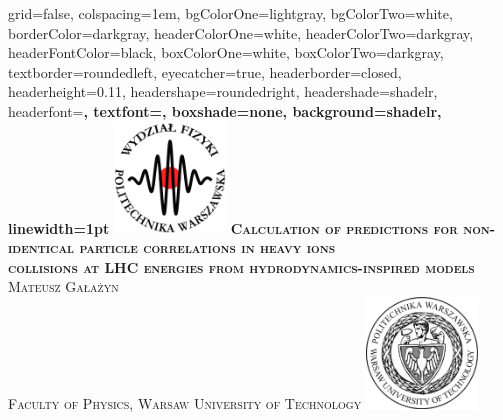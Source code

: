 \documentclass[landscape,final,a3paper,fontscale=1]{baposter}
\begin{document}


\begin{poster}%
  {
  grid=false,
  colspacing=1em,
  bgColorOne=lightgray,
  bgColorTwo=white,
  borderColor=darkgray,
  headerColorOne=white,
  headerColorTwo=darkgray,
  headerFontColor=black,
  boxColorOne=white,
  boxColorTwo=darkgray,
  textborder=roundedleft,
  eyecatcher=true,
  headerborder=closed,
  headerheight=0.11\textheight,
  headershape=roundedright,
  headershade=shadelr,
  headerfont=\large\bf\textsc, %
  textfont={\setlength{\parindent}{1.5em}},
  boxshade=none,
  background=shadelr,
  linewidth=1pt
  }
  {\includegraphics[height=8em]{wut_physics.png}} 
  {\bf\textsc{\huge{Calculation of predictions for non-identical particle correlations in heavy ions\\\vspace{0.3em}collisions at LHC energies from hydrodynamics-inspired models}}\vspace{0.1em}}
  {\textsc{Mateusz Gałażyn\\\small{Faculty of Physics, Warsaw University of Technology}}}
  {%
    \includegraphics[height=8em]{wut.png}
  }


\end{poster}
\end{document}
